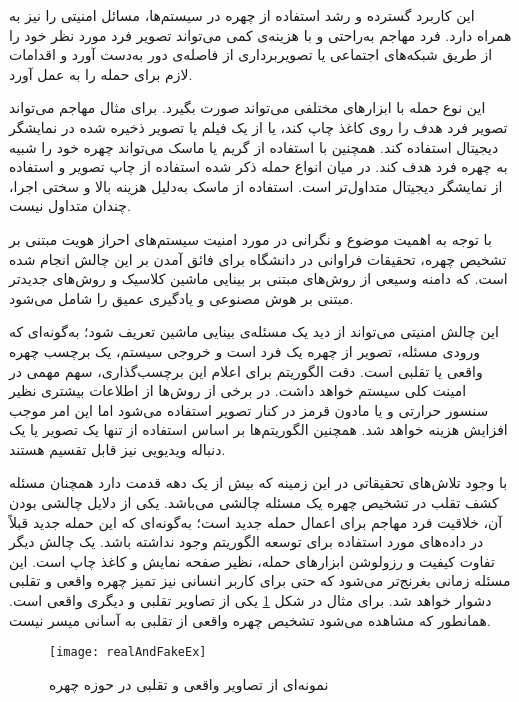 این کاربرد گسترده و رشد استفاده از چهره در سیستم‌ها، مسائل امنیتی را نیز به همراه دارد. فرد مهاجم به‌راحتی و با هزینه‌ی کمی می‌تواند تصویر فرد مورد نظر خود را از طریق شبکه‌های اجتماعی یا تصویر‌برداری از فاصله‌ی دور به‌دست آورد و اقدامات لازم برای حمله را به عمل آورد.

این نوع حمله با ابزارهای مختلفی می‌تواند صورت بگیرد. برای مثال مهاجم می‌تواند تصویر فرد هدف را روی کاغذ چاپ کند، یا از یک فیلم یا تصویر ذخیره شده در نمایشگر دیجیتال استفاده کند. همچنین با استفاده از گریم یا ماسک می‌تواند چهره خود را شبیه به چهره فرد هدف کند. در میان انواع حمله ذکر شده استفاده از چاپ تصویر و استفاده از نمایشگر دیجیتال متداول‌تر است. استفاده از ماسک به‌دلیل هزینه بالا و سختی اجرا، چندان متداول نیست.

 با توجه به اهمیت موضوع و نگرانی در مورد امنیت سیستم‌های احراز هویت مبتنی بر تشخیص چهره، تحقیقات فراوانی در دانشگاه برای فائق آمدن بر این چالش انجام شده است. که دامنه وسیعی از روش‌های مبتنی بر بینایی ماشین کلاسیک و روش‌های جدیدتر مبتنی بر هوش مصنوعی و یادگیری عمیق را شامل می‌شود.

این چالش امنیتی می‌تواند از دید یک مسئله‌ی بینایی ماشین تعریف شود؛ به‌گونه‌ای که ورودی مسئله، تصویر از چهره یک فرد است و خروجی سیستم، یک برچسب چهره واقعی یا تقلبی است. دقت الگوریتم برای اعلام این برچسب‌گذاری، سهم مهمی در امینت کلی سیستم خواهد داشت. در برخی از روش‌ها از اطلاعات بیشتری نظیر سنسور حرارتی و یا مادون قرمز در کنار تصویر استفاده می‌شود اما این امر موجب افزایش هزینه خواهد شد. همچنین الگوریتم‌ها بر اساس استفاده از تنها یک تصویر یا یک دنباله ویدیویی نیز قابل تقسیم هستند.


با وجود تلاش‌های تحقیقاتی در این زمینه که بیش از یک دهه قدمت دارد همچنان مسئله کشف تقلب در تشخیص چهره یک مسئله چالشی می‌باشد. یکی از دلایل چالشی بودن آن، خلاقیت فرد مهاجم برای اعمال حمله جدید است؛ به‌گونه‌ای که این  حمله جدید قبلاً در داده‌های مورد استفاده برای توسعه الگوریتم وجود نداشته باشد. یک چالش دیگر تفاوت کیفیت و رزولوشن ابزارهای حمله، نظیر صفحه نمایش و کاغذ چاپ است. این مسئله زمانی بغرنج‌تر می‌شود که حتی برای کاربر انسانی نیز تمیز چهره واقعی و تقلبی دشوار خواهد شد. برای مثال در شکل 
\ref{fig:realandfake}
یکی از تصاویر تقلبی و دیگری واقعی است. همانطور که مشاهده می‌شود تشخیص چهره واقعی از تقلبی به آسانی میسر نیست.


\begin{figure}[ht]
	\centerline{\texttt{[image: realAndFakeEx]}}
	\caption{نمونه‌ای از تصاویر واقعی و تقلبی در حوزه چهره \cite{boulkenafet2017oulu}}
	\label{fig:realandfake}
\end{figure}

